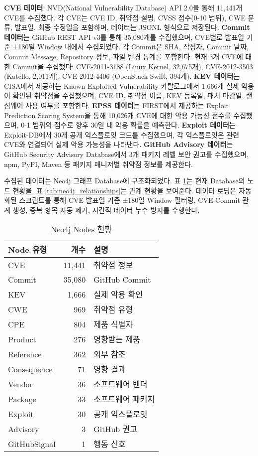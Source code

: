 ﻿\documentclass[conference]{IEEEtran}
\begin{document}
\textbf{CVE 데이터}: NVD(National Vulnerability Database) API 2.0을 통해 11,441개 CVE를 수집했다. 각 CVE는 CVE ID, 취약점 설명, CVSS 점수(0-10 범위), CWE 분류, 발표일, 최종 수정일을 포함하며, 데이터는 JSONL 형식으로 저장된다. \textbf{Commit 데이터}는 GitHub REST API v3를 통해 35,080개를 수집했으며, CVE별로 발표일 기준 ±180일 Window 내에서 수집되었다. 각 Commit은 SHA, 작성자, Commit 날짜, Commit Message, Repository 정보, 파일 변경 통계를 포함한다. 현재 3개 CVE에 대한 Commit을 수집했다: CVE-2011-3188 (Linux Kernel, 32,675개), CVE-2012-3503 (Katello, 2,011개), CVE-2012-4406 (OpenStack Swift, 394개). \textbf{KEV 데이터}는 CISA에서 제공하는 Known Exploited Vulnerability 카탈로그에서 1,666개 실제 악용이 확인된 취약점을 수집했으며, CVE ID, 취약점 이름, KEV 등록일, 패치 마감일, 랜섬웨어 사용 여부를 포함한다. \textbf{EPSS 데이터}는 FIRST에서 제공하는 Exploit Prediction Scoring System을 통해 10,026개 CVE에 대한 악용 가능성 점수를 수집했으며, 0-1 범위의 점수로 향후 30일 내 악용 확률을 예측한다. \textbf{Exploit 데이터}는 Exploit-DB에서 30개 공개 익스플로잇 코드를 수집했으며, 각 익스플로잇은 관련 CVE와 연결되어 실제 악용 가능성을 나타낸다. \textbf{GitHub Advisory 데이터}는 GitHub Security Advisory Database에서 3개 패키지 레벨 보안 권고를 수집했으며, npm, PyPI, Maven 등 패키지 매니저별 취약점 정보를 제공한다.

수집된 데이터는 Neo4j 그래프 Database에 구조화되었다. 표 \ref{tab:neo4j_nodes}는 현재 Database의 노드 현황을, 표 \ref{tab:neo4j_relationships}는 관계 현황을 보여준다. 데이터 로딩은 자동화된 스크립트를 통해 CVE 발표일 기준 ±180일 Window 필터링, CVE-Commit 관계 생성, 중복 항목 자동 제거, 시간적 데이터 누수 방지를 수행한다.


\begin{table}[h]
\centering
\caption{Neo4j Nodes 현황}
\label{tab:neo4j_nodes}
\begin{tabular}{lrl}
\toprule
\textbf{Node 유형} & \textbf{개수} & \textbf{설명} \\
\midrule
CVE & 11,441 & 취약점 정보 \\
Commit & 35,080 & GitHub Commit \\
KEV & 1,666 & 실제 악용 확인 \\
CWE & 969 & 취약점 유형 \\
CPE & 804 & 제품 식별자 \\
Product & 276 & 영향받는 제품 \\
Reference & 362 & 외부 참조 \\
Consequence & 71 & 영향 결과 \\
Vendor & 36 & 소프트웨어 벤더 \\
Package & 33 & 소프트웨어 패키지 \\
Exploit & 30 & 공개 익스플로잇 \\
Advisory & 3 & GitHub 권고 \\
GitHubSignal & 1 & 행동 신호 \\
\bottomrule
\end{tabular}
\end{table}
\end{document}
